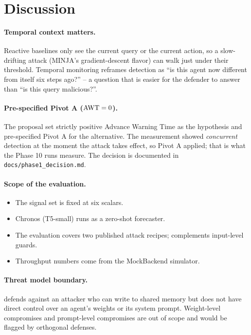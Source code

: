 \section{Discussion}
\label{sec:discussion}

\paragraph{Temporal context matters.}
Reactive baselines only see the current query or the current action,
so a slow-drifting attack (MINJA's gradient-descent flavor) can walk
just under their threshold. Temporal monitoring reframes detection as
``is this agent now different from itself six steps ago?'' -- a
question that is easier for the defender to answer than ``is this
query malicious?''.

\paragraph{Pre-specified Pivot A (\texorpdfstring{$\text{AWT}{} = 0$}{AWT = 0}).}
The proposal set strictly positive Advance Warning Time as the
hypothesis and pre-specified Pivot A for the alternative. The
measurement showed \emph{concurrent} detection at the moment the attack
takes effect, so Pivot A applied; that is what the Phase 10 runs
measure. The decision is documented in \texttt{docs/phase1\_decision.md}.

\paragraph{Scope of the evaluation.}
\begin{itemize}
  \item The signal set is fixed at six scalars.
  \item Chronos (T5-small) runs as a zero-shot forecaster.
  \item The evaluation covers two published attack recipes; \sys{}
  complements input-level guards.
  \item Throughput numbers come from the MockBackend simulator.
\end{itemize}

\paragraph{Threat model boundary.}
\sys{} defends against an attacker who can write to shared memory but
does not have direct control over an agent's weights or its system
prompt. Weight-level compromises and prompt-level compromises are out
of scope and would be flagged by orthogonal defenses.
